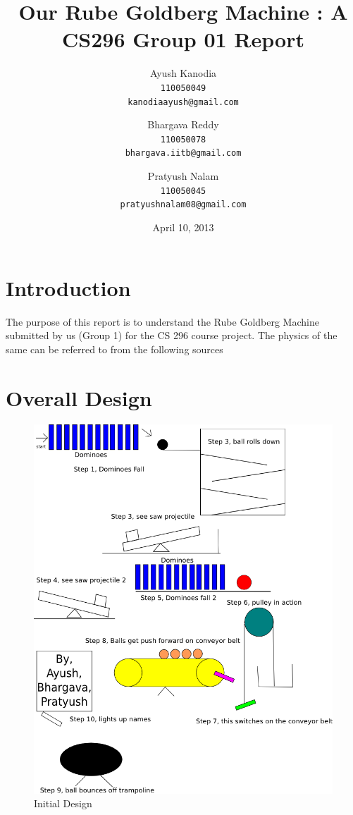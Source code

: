 \documentclass[a4paper,11pt]{article}
\title{Our Rube Goldberg Machine : A CS296 Group 01 Report}
\date{April 10, 2013}
\author{Ayush Kanodia\\
  \texttt{110050049}\\
  \texttt{kanodiaayush@gmail.com}
  \and
  Bhargava Reddy\\
  \texttt{110050078}\\
  \texttt{bhargava.iitb@gmail.com}
  \and
  Pratyush Nalam\\
  \texttt{110050045}\\
  \texttt{pratyushnalam08@gmail.com}
}
\begin{document}
   \maketitle
   
 
   \section{Introduction}
      The purpose of this report is to understand the Rube Goldberg Machine submitted by us (Group 1) for the CS 296 course project. The physics of the same can be referred to from the following sources~\cite{see-saw}~\cite{free-body}~\cite{pendulum-motion}~\cite{google}~\cite{stackoverflow}~\cite{iforce2d}

  \section{Overall Design}
	\begin{figure}
	\includegraphics[scale=0.35]{00_original_blueprint.png}
	\caption{Initial Design}
	\end{figure}
\end{document}

